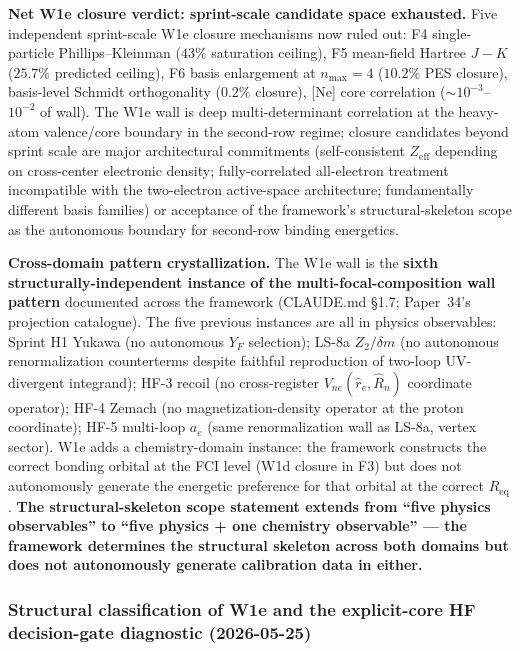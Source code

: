 \documentclass[aps,pra,twocolumn,superscriptaddress,longbibliography]{revtex4-2}
\begin{document}
\textbf{Net W1e closure verdict: sprint-scale candidate space
exhausted.} Five independent sprint-scale W1e closure mechanisms
now ruled out: F4 single-particle Phillips--Kleinman ($43\%$
saturation ceiling), F5 mean-field Hartree $J - K$ ($25.7\%$
predicted ceiling), F6 basis enlargement at $n_{\max} = 4$
($10.2\%$ PES closure), basis-level Schmidt orthogonality
($0.2\%$ closure), [Ne] core correlation
($\sim 10^{-3}$--$10^{-2}$ of wall). The W1e wall is deep
multi-determinant correlation at the heavy-atom valence/core
boundary in the second-row regime; closure candidates beyond
sprint scale are major architectural commitments
(self-consistent $Z_\text{eff}$ depending on cross-center
electronic density; fully-correlated all-electron treatment
incompatible with the two-electron active-space architecture;
fundamentally different basis families) or acceptance of the
framework's structural-skeleton scope as the autonomous boundary
for second-row binding energetics.

\textbf{Cross-domain pattern crystallization.} The W1e wall is the
\textbf{sixth structurally-independent instance of the
multi-focal-composition wall pattern} documented across the
framework (CLAUDE.md \S1.7; Paper~34's projection catalogue). The five previous
instances are all in physics observables: Sprint H1 Yukawa (no
autonomous $Y_F$ selection); LS-8a $Z_2/\delta m$ (no autonomous
renormalization counterterms despite faithful reproduction of
two-loop UV-divergent integrand); HF-3 recoil (no cross-register
$V_{ne}(\hat r_e, \hat R_n)$ coordinate operator); HF-4 Zemach
(no magnetization-density operator at the proton coordinate);
HF-5 multi-loop $a_e$ (same renormalization wall as LS-8a, vertex
sector). W1e adds a chemistry-domain instance: the framework
constructs the correct bonding orbital at the FCI level (W1d
closure in F3) but does not autonomously generate the energetic
preference for that orbital at the correct $R_\text{eq}$.
\textbf{The structural-skeleton scope statement extends from
``five physics observables'' to ``five physics + one chemistry
observable'' --- the framework determines the structural skeleton
across both domains but does not autonomously generate calibration
data in either.}

\subsubsection{Structural classification of W1e and the
explicit-core HF decision-gate diagnostic (2026-05-25)}
\label{sec:w1e_classification_and_diagnostic}
\end{document}
